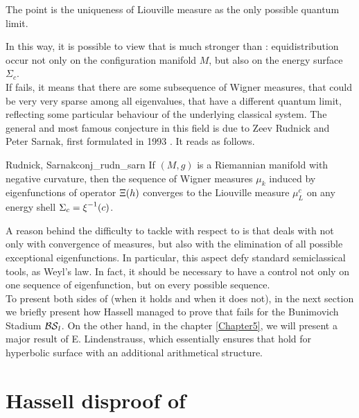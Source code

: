 The point is the uniqueness of Liouville measure as the only possible quantum limit.


In this way, it is possible to view that \QUE is much stronger than \QE: equidistribution occur not only on the configuration manifold $M$, but also on the energy surface $\Sigma_{c}$.\\

If \QUE fails, it means that there are some subsequence of Wigner measures, that could be very very sparse among all eigenvalues, that have a different quantum limit, reflecting some particular behaviour of the underlying classical system. The general and most famous conjecture in this field is due to Zeev Rudnick and Peter Sarnak, first formulated in 1993 \cite{RudSarn:conj}. It reads as follows.

\begin{impConj}{Rudnick, Sarnak}{conj_rudn_sarn}
If $(M,g)$ is a Riemannian manifold with negative curvature, then the sequence of Wigner measures $\mu_{k}$ induced by eigenfunctions of operator $\Xi(h)$ converges to the Liouville measure $\mu_{L}^{c}$ on any energy shell $\Sigma_{c}=\operatorname{\xi}^{-1}(c)$.
\end{impConj}

A reason behind the difficulty to tackle \QUE with respect to \QE is that \QUE deals with not only with convergence of
measures, but also with the elimination of all possible exceptional eigenfunctions. In particular, this aspect defy standard semiclassical tools, as Weyl's law. In fact, it should be necessary to have a control not only on one sequence of eigenfunction, but on every possible sequence.\\

To present both sides of \QUE (when it holds and when it does not), in the next section we briefly present how Hassell managed to prove that \QUE fails for the Bunimovich Stadium $\operatorname{\mathcal{BS}}_{l}$. On the other hand, in the chapter \ref{Chapter5}, we will present a major result of E. Lindenstrauss, which essentially ensures that \QUE hold for hyperbolic surface with an additional arithmetical structure.



\section{Hassell disproof of \QUE}



